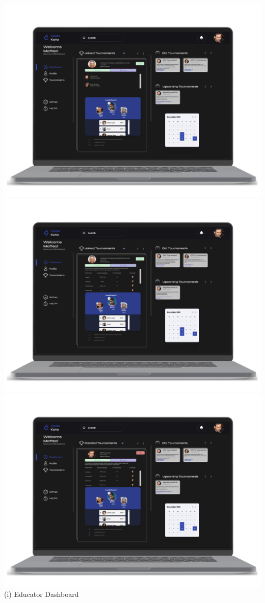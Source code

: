 \begin{center}
\includegraphics[scale=0.13]{Images/ui-ux/educator_dashboard_1.png}
\includegraphics[scale=0.13]{Images/ui-ux/educator_dashboard_2.png}
\includegraphics[scale=0.13]{Images/ui-ux/educator_dashboard_3.png}
\\ (i) Educator Dashboard
\end{center}
